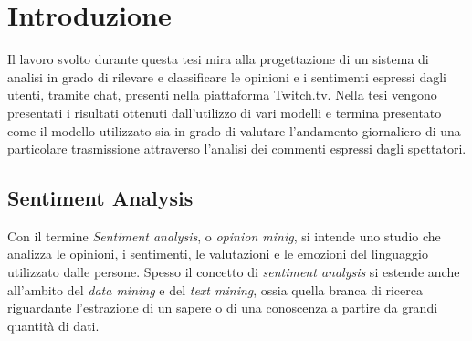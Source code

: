 \documentclass[a4paper,12pt,openright,twoside]{report}
\makeatletter
\theoremstyle{definition}
\def\cleardoublepage{\clearpage\if@twoside \ifodd\c@page\else
\hbox{}
\vspace*{\fill}
\begin{center}
\textit{ }
\end{center}
\vspace{\fill}
\thispagestyle{empty}
\newpage
\if@twocolumn\hbox{}\newpage\fi\fi\fi}
\makeatother
\begin{document}

\clearpage{\pagestyle{empty}\cleardoublepage}
\tableofcontents                        %
\rhead[\fancyplain{}{\bfseries\leftmark}]{\fancyplain{}{\bfseries\thepage}}

\lhead[\fancyplain{}{\bfseries\thepage}]{\fancyplain{}{\bfseries\rightmark}}


\chapter{Introduzione}
Il lavoro svolto durante questa tesi mira alla progettazione di un sistema di analisi 
in grado di rilevare e classificare le opinioni e i sentimenti espressi dagli utenti,
tramite chat,
presenti nella piattaforma Twitch.tv.
Nella tesi vengono presentati i risultati ottenuti dall'utilizzo di vari modelli
e termina presentato come il modello utilizzato sia in grado di valutare l'andamento giornaliero
di una particolare trasmissione attraverso l'analisi dei commenti espressi dagli spettatori.

\section{Sentiment Analysis}
\label{sec:sentAnal}
Con il termine \emph{Sentiment analysis}, o \emph{opinion minig}, si intende uno studio 
che analizza le opinioni, i sentimenti, le valutazioni e le
emozioni del linguaggio utilizzato dalle persone.
Spesso il concetto di \emph{sentiment analysis} si estende anche all'ambito del \emph{data mining} e
del \emph{text mining}, ossia quella branca di ricerca riguardante l'estrazione di un sapere o 
di una conoscenza a partire da grandi quantità di dati.
\end{document}
